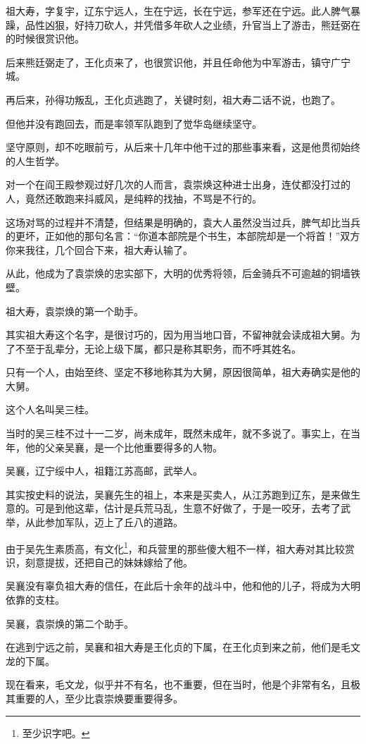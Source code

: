 \begin{multicols}{\theparacolNo}
祖大寿，字复宇，辽东宁远人，生在宁远，长在宁远，参军还在宁远。此人脾气暴躁，品性凶狠，好持刀砍人，并凭借多年砍人之业绩，升官当上了游击，熊廷弼在的时候很赏识他。

后来熊廷弼走了，王化贞来了，也很赏识他，并且任命他为中军游击，镇守广宁城。

再后来，孙得功叛乱，王化贞逃跑了，关键时刻，祖大寿二话不说，也跑了。

但他并没有跑回去，而是率领军队跑到了觉华岛继续坚守。

坚守原则，却不吃眼前亏，从后来十几年中他干过的那些事来看，这是他贯彻始终的人生哲学。

对一个在阎王殿参观过好几次的人而言，袁崇焕这种进士出身，连仗都没打过的人，竟然还敢跑来抖威风，是纯粹的找抽，不骂是不行的。

这场对骂的过程并不清楚，但结果是明确的，袁大人虽然没当过兵，脾气却比当兵的更坏，正如他的那句名言：“你道本部院是个书生，本部院却是一个将首！”双方你来我往，几个回合下来，祖大寿认输了。

从此，他成为了袁崇焕的忠实部下，大明的优秀将领，后金骑兵不可逾越的铜墙铁壁。

祖大寿，袁崇焕的第一个助手。

其实祖大寿这个名字，是很讨巧的，因为用当地口音，不留神就会读成祖大舅。为了不至于乱辈分，无论上级下属，都只是称其职务，而不呼其姓名。

只有一个人，由始至终、坚定不移地称其为大舅，原因很简单，祖大寿确实是他的大舅。

这个人名叫吴三桂。

当时的吴三桂不过十一二岁，尚未成年，既然未成年，就不多说了。事实上，在当年，他的父亲吴襄，是一个比他重要得多的人物。

吴襄，辽宁绥中人，祖籍江苏高邮，武举人。

其实按史料的说法，吴襄先生的祖上，本来是买卖人，从江苏跑到辽东，是来做生意的。可是到他这辈，估计是兵荒马乱，生意不好做了，于是一咬牙，去考了武举，从此参加军队，迈上了丘八的道路。

由于吴先生素质高，有文化\footnote{至少识字吧。}，和兵营里的那些傻大粗不一样，祖大寿对其比较赏识，刻意提拔，还把自己的妹妹嫁给了他。

吴襄没有辜负祖大寿的信任，在此后十余年的战斗中，他和他的儿子，将成为大明依靠的支柱。

吴襄，袁崇焕的第二个助手。

在逃到宁远之前，吴襄和祖大寿是王化贞的下属，在王化贞到来之前，他们是毛文龙的下属。

现在看来，毛文龙，似乎并不有名，也不重要，但在当时，他是个非常有名，且极其重要的人，至少比袁崇焕要重要得多。


\end{multicols}
